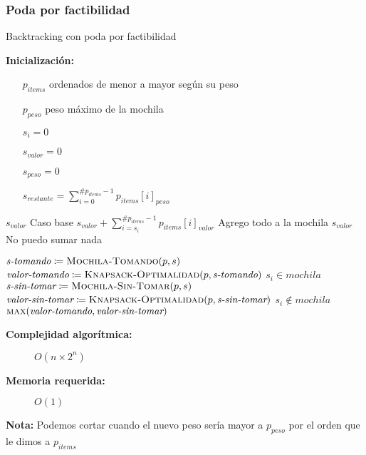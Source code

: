 \documentclass[fleqn, 11pt]{article}
\def\is{\coloneqq}
\begin{document}
\subsubsection{Poda por factibilidad}
\begin{algorithm}
\caption{Backtracking con poda por factibilidad}
\begin{algorithmic}[1]
\item[\textbf{Inicialización:}]
\item[] \begin{itemize}
	\item[] $p_{items}$ ordenados de menor a mayor según su peso
	\item[] $p_{peso}$ peso máximo de la mochila
	\item[] $s_i = 0$
	\item[] $s_{valor} = 0$
	\item[] $s_{peso} = 0$
	\item[] $s_{restante} = \sum_{i = 0}^{\#p_{items} - 1} p_{items}[i]_{peso}$
\end{itemize}
\Statex
{}
	\State \Return $s_{valor}$
	\Comment Caso base
\EndIf
{}
	\State \Return $s_{valor} + \sum_{i=s_i}^{\#p_{items} - 1} p_{items}[i]_{valor}$
	\Comment Agrego todo a la mochila
\EndIf
{}
	\State \Return $s_{valor}$
	\Comment No puedo sumar nada
\EndIf

\State $\textit{s-tomando} \is \Call{Mochila-Tomando}{p, s}$
\State $\textit{valor-tomando} \is \Call{Knapsack-Optimalidad}{p, \textit{s-tomando}}$
\Comment $s_i \in mochila$
\State $\textit{s-sin-tomar} \is \Call{Mochila-Sin-Tomar}{p, s}$
\State $\textit{valor-sin-tomar} \is \Call{Knapsack-Optimalidad}{p, \textit{s-sin-tomar}}$
\Comment $s_i \not\in mochila$
\State \Return $\Call{max}{\textit{valor-tomando}, \textit{valor-sin-tomar}}$
\EndFunction
\end{algorithmic}
\begin{description}
	\item[\textbf{Complejidad algorítmica:}] $O(n \times 2^n)$
	\item[\textbf{Memoria requerida:}] $O(1)$
\end{description}
\end{algorithm}

\textbf{Nota:} Podemos cortar cuando el nuevo peso sería mayor a $p_{peso}$ por
el orden que le dimos a $p_{items}$
\end{document}
